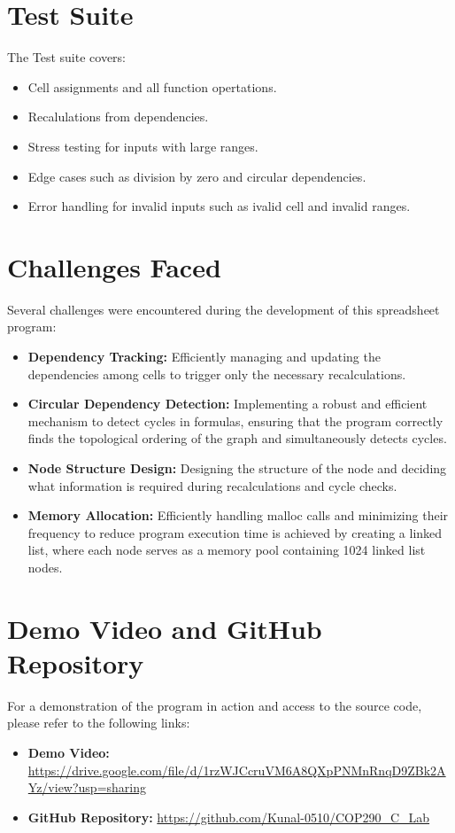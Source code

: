 \documentclass[a4paper,12pt,oneside]{article}
\begin{document}
\section{Test Suite}
The Test suite covers:
\begin{itemize}
    \item Cell assignments and all function opertations.
    \item Recalulations from dependencies.
    \item Stress testing for inputs with large ranges.
    \item Edge cases such as division by zero and circular dependencies.
    \item Error handling for invalid inputs such as ivalid cell and invalid ranges.
\end{itemize}


\section{Challenges Faced}
Several challenges were encountered during the development of this spreadsheet program:
\begin{itemize}
    \item \textbf{Dependency Tracking:} Efficiently managing and updating the dependencies among cells to trigger only the necessary recalculations.
    \item \textbf{Circular Dependency Detection:} Implementing a robust and efficient mechanism to detect cycles in formulas, ensuring that the program correctly finds the topological ordering of the graph and simultaneously detects cycles.
    \item \textbf{Node Structure Design:} Designing the structure of the node and deciding what information is required during recalculations and cycle checks.
    \item \textbf{Memory Allocation:} Efficiently handling malloc calls and minimizing their frequency to reduce program execution time is achieved by creating a linked list, where each node serves as a memory pool containing 1024 linked list nodes.
\end{itemize}

\section{Demo Video and GitHub Repository}
For a demonstration of the program in action and access to the source code, please refer to the following links:
\begin{itemize}
    \item \textbf{Demo Video:} \url{https://drive.google.com/file/d/1rzWJCcruVM6A8QXpPNMnRnqD9ZBk2AYz/view?usp=sharing}
    \item \textbf{GitHub Repository:} \url{https://github.com/Kunal-0510/COP290_C_Lab}
\end{itemize}
\end{document}
